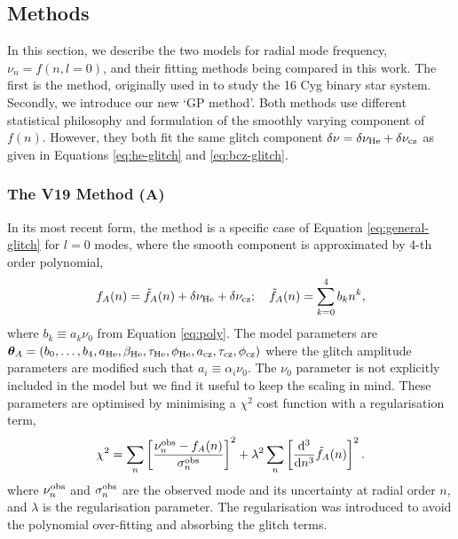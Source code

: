 \subsection{Methods}\label{sec:glitch-methods}

In this section, we describe the two models for radial mode frequency, \(\nu_n = f(n, l=0)\), and their fitting methods being compared in this work. The first is the  method, originally used in \citet{Verma.Faria.ea2014} to study the 16 Cyg binary star system. Secondly, we introduce our new `GP method'. Both methods use different statistical philosophy and formulation of the smoothly varying component of \(f(n)\). However, they both fit the same glitch component \(\delta\nu = \delta\nu_{{\mathrm{He}}} + \delta\nu_{{\mathrm{cz}}}\) as given in Equations \ref{eq:he-glitch} and \ref{eq:bcz-glitch}.

\subsubsection{The V19 Method (A)}

In its most recent form, the  method is a specific case of Equation \ref{eq:general-glitch} for \(l=0\) modes, where the smooth component is approximated by 4-th order polynomial,
%
\begin{equation}
    f_A(n) = \tilde{f}_A(n) + \delta\nu_{{\mathrm{He}}} + \delta\nu_{{\mathrm{cz}}}; \quad \tilde{f}_A(n) = \sum_{k=0}^{4} b_k n^k,
\end{equation}
%
\sloppy where \(b_k \equiv a_k \nu_0\) from Equation \ref{eq:poly}. The model parameters are \(\bm{\theta}_A = (b_0, \dots, b_4, a_{{\mathrm{He}}}, \beta_{{\mathrm{He}}}, \tau_{{\mathrm{He}}}, \phi_{{\mathrm{He}}}, a_{{\mathrm{cz}}}, \tau_{{\mathrm{cz}}}, \phi_{{\mathrm{cz}}})\) where the glitch amplitude parameters are modified such that \(a_i \equiv \alpha_i\nu_0\). The \(\nu_0\) parameter is not explicitly included in the  model but we find it useful to keep the scaling in mind. These parameters are optimised by minimising a \(\chi^2\) cost function with a regularisation term,
%
\begin{equation}
    \chi^2 = \sum_n \left[ \frac{\nu_n^{{\mathrm{obs}}} - f_{A}(n)}{\sigma_n^{{\mathrm{obs}}}} \right]^2 + \lambda^2 \sum_n \left[ \frac{\mathrm{d}^3}{\mathrm{d} n^3} \tilde{f}_A(n)\right]^2.
\end{equation}
%
where \(\nu_n^{{\mathrm{obs}}}\) and \(\sigma_n^{{\mathrm{obs}}}\) are the observed mode and its uncertainty at radial order \(n\), and \(\lambda\) is the regularisation parameter. The regularisation was introduced to avoid the polynomial over-fitting and absorbing the glitch terms.

